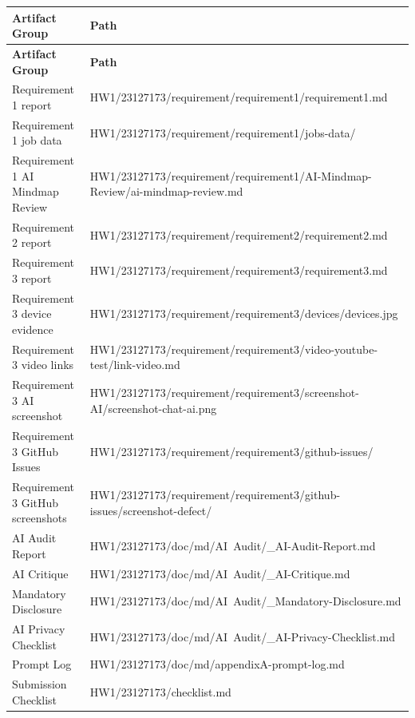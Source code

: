 \documentclass[12pt, a4paper]{article}
\begin{document}
\begin{longtable}{@{} L{4.5cm} p{9.5cm} @{}}
\toprule
\textbf{Artifact Group} & \textbf{Path} \\
\midrule
\endfirsthead
\toprule
\textbf{Artifact Group} & \textbf{Path} \\
\midrule
\endhead
\bottomrule
\endfoot
Requirement 1 report          & {\small\ttfamily HW1/23127173/requirement/requirement1/\allowbreak requirement1.md} \\[2pt]
Requirement 1 job data        & {\small\ttfamily HW1/23127173/requirement/requirement1/\allowbreak jobs-data/} \\[2pt]
Requirement 1 AI Mindmap Review & {\small\ttfamily HW1/23127173/requirement/requirement1/\allowbreak AI-Mindmap-Review/\allowbreak ai-mindmap-review.md} \\[2pt]
Requirement 2 report          & {\small\ttfamily HW1/23127173/requirement/requirement2/\allowbreak requirement2.md} \\[2pt]
Requirement 3 report          & {\small\ttfamily HW1/23127173/requirement/requirement3/\allowbreak requirement3.md} \\[2pt]
Requirement 3 device evidence & {\small\ttfamily HW1/23127173/requirement/requirement3/\allowbreak devices/devices.jpg} \\[2pt]
Requirement 3 video links     & {\small\ttfamily HW1/23127173/requirement/requirement3/\allowbreak video-youtube-test/link-video.md} \\[2pt]
Requirement 3 AI screenshot   & {\small\ttfamily HW1/23127173/requirement/requirement3/\allowbreak screenshot-AI/screenshot-chat-ai.png} \\[2pt]
Requirement 3 GitHub Issues & {\small\ttfamily HW1/23127173/requirement/requirement3/\allowbreak github-issues/} \\[2pt]
Requirement 3 GitHub screenshots & {\small\ttfamily HW1/23127173/requirement/requirement3/\allowbreak github-issues/screenshot-defect/} \\[2pt]
AI Audit Report               & {\small\ttfamily HW1/23127173/doc/md/AI~Audit/\_AI-Audit-Report.md} \\[2pt]
AI Critique                   & {\small\ttfamily HW1/23127173/doc/md/AI~Audit/\_AI-Critique.md} \\[2pt]
Mandatory Disclosure          & {\small\ttfamily HW1/23127173/doc/md/AI~Audit/\_Mandatory-Disclosure.md} \\[2pt]
AI Privacy Checklist          & {\small\ttfamily HW1/23127173/doc/md/AI~Audit/\_AI-Privacy-Checklist.md} \\[2pt]
Prompt Log                    & {\small\ttfamily HW1/23127173/doc/md/\allowbreak appendixA-prompt-log.md} \\[2pt]
Submission Checklist          & {\small\ttfamily HW1/23127173/checklist.md} \\
\end{longtable}
\end{document}
